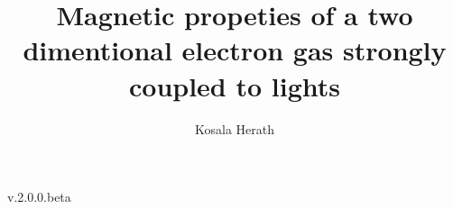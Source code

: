 \documentclass[a4paper]{article}
\title{Magnetic propeties of a two dimentional electron gas strongly coupled to lights}
\author{Kosala Herath}
\numberwithin{equation}{subsection}
\numberwithin{equation}{section}
\begin{document}
\maketitle

\begin{center}
{v.2.0.0.beta}
\end{center}

% 
% 
% 

\newpage

\newpage

\newpage

\end{document}
